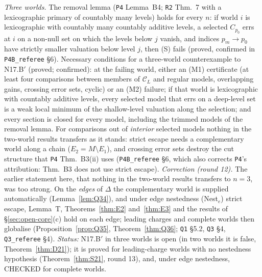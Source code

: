 \documentclass[11pt]{article}
\theoremstyle{definition}
\theoremstyle{remark}
\newcommand{\C}{\mathcal C}
\newcommand{\src}[1]{\texttt{#1}}
\begin{document}
\emph{Three worlds.} The removal lemma (\src{P4} Lemma~B4; \src{R2} Thm.~7 with a lexicographic primary of countably many levels) holds for every $n$: if world $i$ is lexicographic with countably many countably additive levels, a selected $C_{p_0}$ errs at $i$ on a non-null set on which the levels below $j$ vanish, and indices $p_m\to p_0$ have strictly smaller valuation below level $j$, then (S) fails (proved, confirmed in \src{P4B\_referee} \S6). Necessary conditions for a three-world counterexample to N17.B$'$ (proved; confirmed): at the failing world, either an (M1) certificate (at least four comparisons between members of $\C_L$ and regular models, overlapping gains, crossing error sets, cyclic) or an (M2) failure; if that world is lexicographic with countably additive levels, every selected model that errs on a deep-level set is a weak local minimum of the shallow-level valuation along the selection; and every section is closed for every model, including the trimmed models of the removal lemma. For comparisons out of \emph{interior} selected models nothing in the two-world results transfers as it stands: strict escape needs a complementary world along a chain ($E_2=M\setminus E_1$), and crossing error sets destroy the cut structure that \src{P4} Thm.~B3(ii) uses (\src{P4B\_referee} \S6, which also corrects \src{P4}'s attribution: Thm.~B3 does not use strict escape). \emph{Correction (round 12).} The earlier statement here, that nothing in the two-world results transfers to $n=3$, was too strong. On the \emph{edges} of $\Delta$ the complementary world is supplied automatically (Lemma~\ref{lem:Q34}), and under edge nestedness (Nest$_e$) strict escape, Lemma~T, Theorems~\ref{thm:E2} and~\ref{thm:E3} and the results of \S\ref{sec:open-core}(c) hold on each edge; leading charges and complete worlds then globalise (Proposition~\ref{prop:Q35}, Theorem~\ref{thm:Q36}; \src{Q1} \S5.2, \src{Q3} \S4, \src{Q3\_referee} \S4). \emph{Status:} N17.B$'$ in three worlds is open (in two worlds it is false, Theorem~\ref{thm:D21}); it is proved for leading-charge worlds with no nestedness hypothesis (Theorem~\ref{thm:S21}, round 13), and, under edge nestedness, CHECKED for complete worlds.
\end{document}
